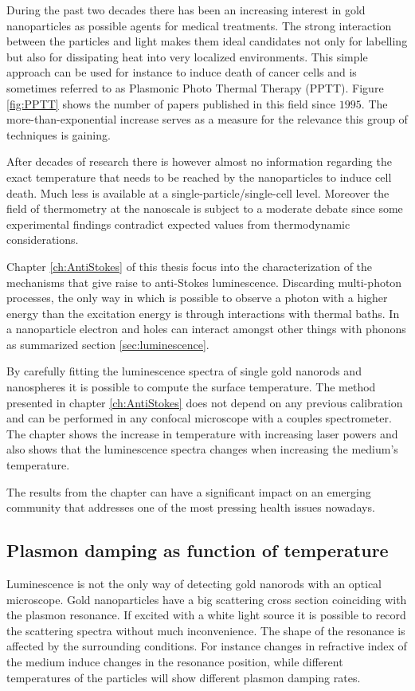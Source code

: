During the past two decades there has been an increasing interest in gold
nanoparticles as possible agents for medical treatments. The strong interaction
between the particles and light makes them ideal candidates not only for
labelling but also for dissipating heat into very localized environments. This
simple approach can be used for instance to induce death of cancer cells and is
sometimes referred to as Plasmonic Photo Thermal Therapy (PPTT). Figure
\ref{fig:PPTT} shows the number of papers published in this field since $1995$.
The more-than-exponential increase serves as a measure for the relevance this
group of techniques is gaining. 

After decades of research there is however almost no information regarding the
exact temperature that needs to be reached by the nanoparticles to induce cell
death. Much less is available at a single-particle/single-cell level. Moreover
the field of thermometry at the nanoscale is subject to a moderate debate since
some experimental findings contradict expected values from thermodynamic
considerations. 

Chapter \ref{ch:AntiStokes} of this thesis focus into the characterization of
the mechanisms that give raise to anti-Stokes luminescence. Discarding
multi-photon processes, the only way in which is possible to observe a photon
with a higher energy than the excitation energy is through interactions with
thermal baths. In a nanoparticle electron and holes can interact amongst other
things with phonons as summarized section \ref{sec:luminescence}. 

By carefully fitting the luminescence spectra of single gold nanorods and
nanospheres it is possible to compute the surface temperature. The method
presented in chapter \ref{ch:AntiStokes} does not depend on any previous
calibration and can be performed in any confocal microscope with a couples
spectrometer. The chapter shows the increase in temperature with increasing
laser powers and also shows that the luminescence spectra changes when
increasing the medium's temperature. 

The results from the chapter can have a significant impact on an emerging
community that addresses one of the most pressing health issues nowadays. 

\subsection{Plasmon damping as function of temperature}
Luminescence is not the only way of detecting gold nanorods with an optical
microscope. Gold nanoparticles have a big scattering cross section coinciding
with the plasmon resonance. If excited with a white light source it is possible
to record the scattering spectra without much inconvenience. The shape of the
resonance is affected by the surrounding conditions. For instance changes in
refractive index of the medium induce changes in the resonance position, while
different temperatures of the particles will show different plasmon damping
rates.


